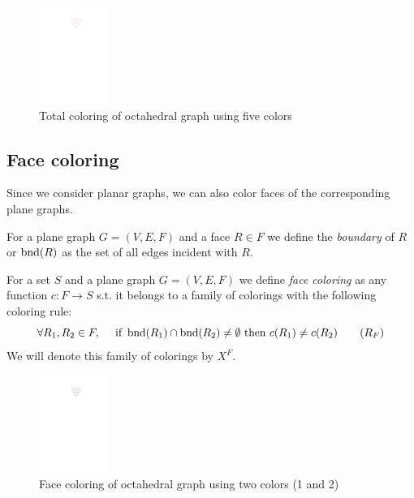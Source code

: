 \begin{figure}[H]
    \centering
    \includegraphics[width=0.2\textwidth]{../Resources/Figs/octahedral_tot_colr.pdf}
    \caption{Total coloring of octahedral graph using five colors}
    \label{fig:octahedral_tot_coloring}
\end{figure}

\subsection{Face coloring}

Since we consider planar graphs, we can also color faces of the corresponding plane graphs.

\begin{definition}[boundary]
    For a plane graph $G=(V,E,F)$ and a face $R \in F$ we define the \emph{boundary} of $R$ or $\operatorname{bnd}(R)$ as the set of all edges incident with $R$.
\end{definition}

\begin{definition}
    For a set $S$ and a plane graph $G=(V,E,F)$ we define \emph{face coloring} as any function $c: F \rightarrow S$ s.t. it belongs to a family of colorings with the following coloring rule:
    \begin{equation}\label{eqn:face_rule}
     \forall R_1,R_2 \in F, \quad \text{ if } \operatorname{bnd}(R_1) \cap \operatorname{bnd}(R_2) \neq \emptyset \text{ then } c(R_1) \neq c(R_2) \tag{$R_F$}
    \end{equation}
    We will denote this family of colorings by $X^F$.
\end{definition}

\begin{figure}[H]
    \centering
    \includegraphics[width=0.2\textwidth]{../Resources/Figs/octahedral_face_colr.pdf}
    \caption{Face coloring of octahedral graph using two colors (1 and 2)}
    \label{fig:face_tot_coloring}
\end{figure}

